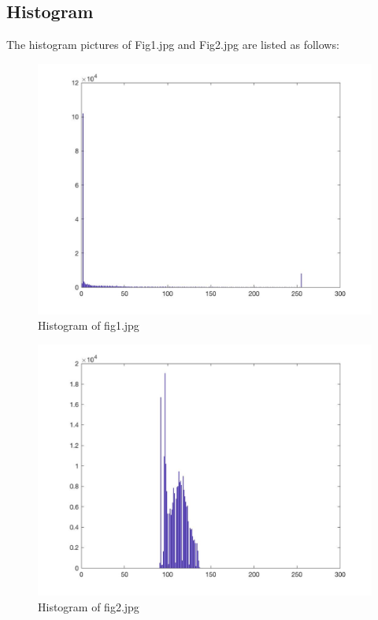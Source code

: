 \documentclass[11pt,oneside]{book}
\begin{document}
\subsection{Histogram}
The histogram pictures of Fig1.jpg and Fig2.jpg are listed as follows:
\begin{figure}[!htb]
   \centering  
   \includegraphics[width=1.0\textwidth]{images/1/histogram1.jpg}
   \caption{Histogram of fig1.jpg}  
\end{figure}
\begin{figure}[!htb]
   \centering  
   \includegraphics[width=1.0\textwidth]{images/1/histogram2.jpg}
   \caption{Histogram of fig2.jpg}  
\end{figure}
\end{document}
